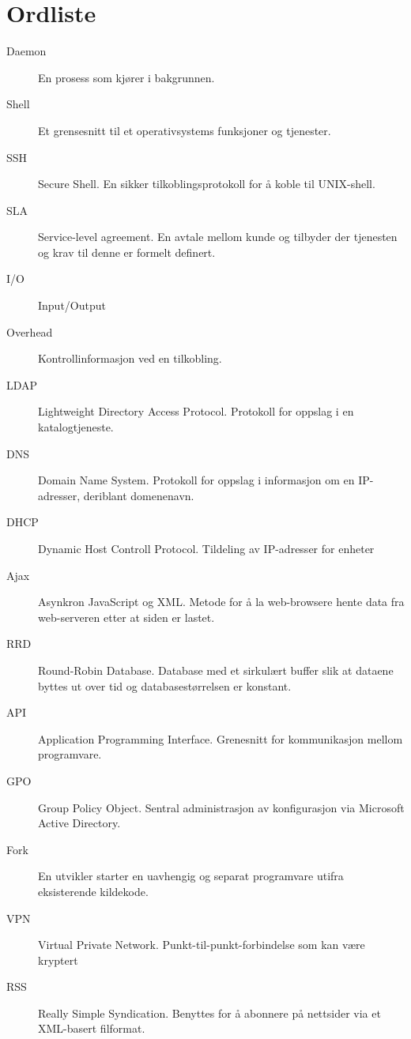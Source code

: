\chapter*{Ordliste}
\begin{description}
	\item[Daemon] En prosess som kjører i bakgrunnen.
	\item[Shell] Et grensesnitt til et operativsystems funksjoner og tjenester.
	\item[SSH] Secure Shell. En sikker tilkoblingsprotokoll for å koble til UNIX-shell.
	\item[SLA] Service-level agreement. En avtale mellom kunde og tilbyder der tjenesten og krav til denne er formelt definert.
	\item[I/O] Input/Output
	\item[Overhead] Kontrollinformasjon ved en tilkobling.
	\item[LDAP] Lightweight Directory Access Protocol. Protokoll for oppslag i en katalogtjeneste.
	\item[DNS] Domain Name System. Protokoll for oppslag i informasjon om en IP-adresser, deriblant domenenavn.
	\item[DHCP] Dynamic Host Controll Protocol. Tildeling av IP-adresser for enheter
	\item[Ajax] Asynkron JavaScript og XML. Metode for å la web-browsere hente data fra web-serveren etter at siden er lastet.
	\item[RRD] Round-Robin Database. Database med et sirkulært buffer slik at dataene byttes ut over tid og databasestørrelsen er konstant.
	\item[API] Application Programming Interface. Grenesnitt for kommunikasjon mellom programvare.
	\item[GPO] Group Policy Object. Sentral administrasjon av konfigurasjon via Microsoft Active Directory.
	\item[Fork] En utvikler starter en uavhengig og separat programvare utifra eksisterende kildekode.
	\item[VPN] Virtual Private Network. Punkt-til-punkt-forbindelse som kan være kryptert
	\item[RSS] Really Simple Syndication. Benyttes for å abonnere på nettsider via et XML-basert filformat.
\end{description}
